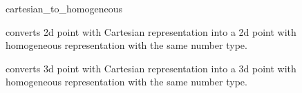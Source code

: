 \begin{ccRefFunction}{cartesian_to_homogeneous}


        {converts 2d point  with Cartesian representation  
         into a 2d point with homogeneous representation with the same
         number type.}

        {converts 3d point  with Cartesian representation  
         into a 3d point with homogeneous representation with the same
         number type.}

\ccTexHtml{\KernelRefLayout}{}
\end{ccRefFunction}

